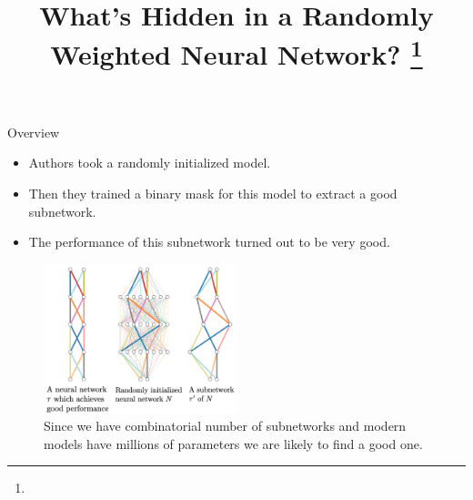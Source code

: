 \documentclass[10pt]{beamer}
\title{What’s Hidden in a Randomly Weighted Neural Network? \footnote{\citepaper{masks_for_random_nns}}}
\begin{document}
\begin{frame}
    \titlepage
\end{frame}

\begin{frame}{Overview}
    \begin{itemize}
        \item\pause Authors took a randomly initialized model.
        \item\pause Then they trained a binary mask for this model to extract a good subnetwork.
        \item\pause The performance of this subnetwork turned out to be very good.
    \end{itemize}
    
    \pause
    \begin{figure}
        \centering
        \includegraphics[width=0.5\textwidth]{images/illustration.png}
        \caption{Since we have combinatorial number of subnetworks and modern models have millions of parameters we are likely to find a good one.}
    \end{figure}
\end{frame}
\end{document}

